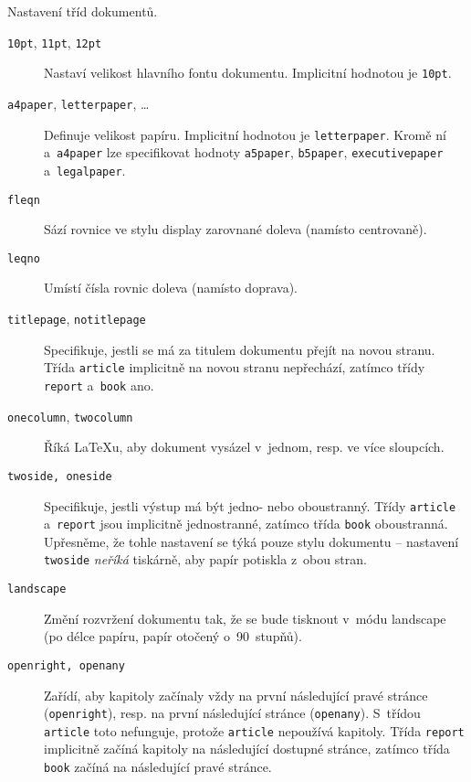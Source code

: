 \begin{table}[!bp]
\caption{Nastavení tříd dokumentů.} \label{options}
\begin{lined}{\textwidth}
\begin{flushleft}
\begin{description}
\item[\normalfont\texttt{10pt}, \texttt{11pt}, \texttt{12pt}] \quad Nastaví
  velikost hlavního fontu dokumentu. Implicitní hodnotou je \texttt{10pt}.%
\item[\normalfont\texttt{a4paper}, \texttt{letterpaper}, \ldots] \quad Definuje
  velikost papíru. Implicitní hodnotou je \texttt{letterpaper}. Kromě
  ní a~\texttt{a4paper} lze specifikovat hodnoty \texttt{a5paper}, \texttt{b5paper},
  \texttt{executivepaper} a~\texttt{legalpaper}.

\item[\normalfont\texttt{fleqn}] \quad Sází rovnice ve stylu
  display zarovnané doleva (namísto centrovaně).

\item[\normalfont\texttt{leqno}] \quad Umístí čísla rovnic doleva
  (namísto doprava).

\item[\normalfont\texttt{titlepage}, \texttt{notitlepage}] \quad Specifikuje,
  jestli se má za titulem dokumentu přejít na novou stranu. Třída
  \texttt{article} implicitně na novou stranu nepřechází, zatímco
  třídy \texttt{report} a~\texttt{book} ano.

\item[\normalfont\texttt{onecolumn}, \texttt{twocolumn}] \quad Říká \LaTeX u,
  aby dokument vysázel v~jednom, resp.
  ve více sloupcích.

\item[\normalfont\texttt{twoside, oneside}] \quad Specifikuje, jestli
  výstup má být jedno- nebo oboustranný.
  Třídy \texttt{article} a~\texttt{report} jsou implicitně
  jednostranné, zatímco třída \texttt{book}
  oboustranná.
  Upřesněme, že tohle nastavení se týká pouze stylu dokumentu --
  nastavení \texttt{twoside} \emph{neříká} tiskárně, aby papír potiskla
  z~obou stran.
\item[\normalfont\texttt{landscape}] \quad Změní rozvržení dokumentu tak,
  že se bude tisknout v~módu landscape (po délce papíru, papír otočený o~90~stupňů).
\item[\normalfont\texttt{openright, openany}] \quad Zařídí, aby
  kapitoly začínaly vždy na první následující pravé stránce (\texttt{openright}),
  resp. na první následující stránce (\texttt{openany}). S~třídou
  \texttt{article} toto nefunguje, protože \texttt{article}
  nepoužívá kapitoly. Třída \texttt{report} implicitně začíná
  kapitoly na následující dostupné stránce, zatímco třída
  \texttt{book} začíná na následující pravé stránce.


\end{description}
\end{flushleft}
\end{lined}
\end{table}
